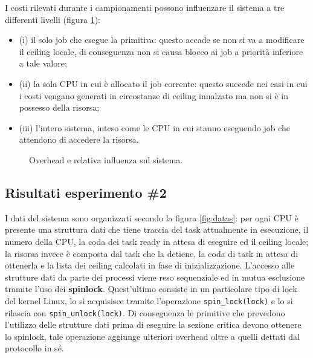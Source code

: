 I costi rilevati durante i campionamenti possono influenzare il sistema a tre differenti livelli (figura \ref{fig:overheads_suffered}):\\

\begin{itemize}
	\item {\color{red} (i)} il solo job che esegue la primitiva: questo accade se non si va a modificare il ceiling locale, di conseguenza non si causa blocco ai job a priorità inferiore a tale valore;
	\item {\color{red} (ii)} la sola CPU in cui è allocato il job corrente: questo succede nei casi in cui i costi vengano generati in circostanze di ceiling innalzato ma non si è in possesso della risorsa;
	\item {\color{red} (iii)} l'intero sistema, inteso come le CPU in cui stanno eseguendo job che attendono di accedere la risorsa.
\end{itemize}

\begin{figure}
\centering
{}
\caption{Overhead e relativa influenza sul sistema.}
\label{fig:overheads_suffered}
\end{figure}

\subsection{Risultati esperimento \#2}
\label{sec:overhead_ris}

I dati del sistema sono organizzati secondo la figura \ref{fig:datas}: per ogni CPU è presente una struttura dati che tiene traccia del task attualmente in esecuzione, il numero della CPU, la coda dei task ready in attesa di eseguire ed il ceiling locale; la risorsa invece è composta dal task che la detiene, la coda di task in attesa di ottenerla e la lista dei ceiling calcolati in fase di inizializzazione. L'accesso alle strutture dati da parte dei processi viene reso sequenziale ed in mutua esclusione tramite l'uso dei \textbf{spinlock}. Quest'ultimo consiste in un particolare tipo di lock del kernel Linux, lo si acquisisce tramite l'operazione \texttt{spin\_lock(lock)} e lo si rilascia con \texttt{spin\_unlock(lock)}. Di conseguenza le primitive che prevedono l'utilizzo delle strutture dati prima di eseguire la sezione critica devono ottenere lo spinlock, tale operazione aggiunge ulteriori overhead oltre a quelli dettati dal protocollo in sé.\\


